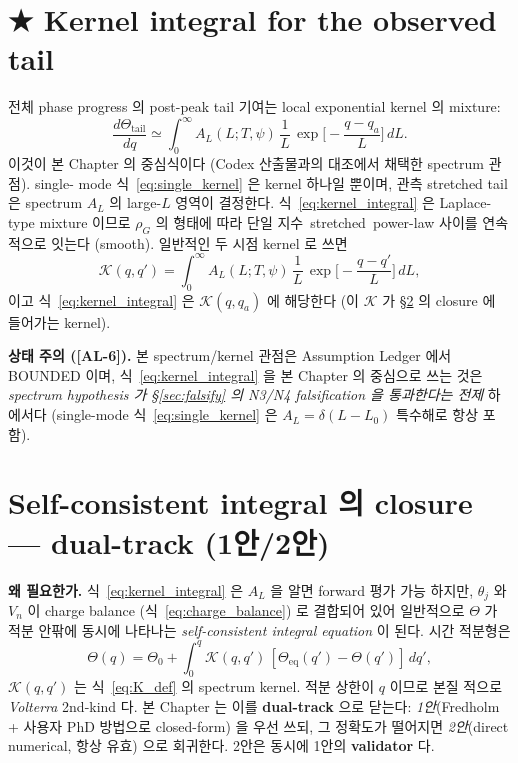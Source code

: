 \documentclass[11pt,a4paper]{article}
\newcommand{\eq}{\mathrm{eq}}
\newcommand{\AL}[1]{\textsf{[AL-#1]}}
\begin{document}
\section{★ Kernel integral for the observed tail}\label{sec:kernel}
전체 phase progress 의 post-peak tail 기여는 local exponential kernel 의 mixture:
\begin{equation}
\boxed{\;\frac{d\Theta_\mathrm{tail}}{dq}\simeq\int_0^\infty A_L(L;T,\psi)\,\frac1L\,
\exp\!\Big[-\frac{q-q_a}{L}\Big]\,dL.\;}
\label{eq:kernel_integral}
\end{equation}
이것이 본 Chapter 의 중심식이다 (Codex 산출물과의 대조에서 채택한 spectrum 관점). single-
mode 식~\eqref{eq:single_kernel} 은 kernel 하나일 뿐이며, 관측 stretched tail 은 spectrum
$A_L$ 의 large-$L$ 영역이 결정한다. 식~\eqref{eq:kernel_integral} 은 Laplace-type mixture
이므로 $\rho_G$ 의 형태에 따라 단일 지수~stretched~power-law 사이를 연속적으로 잇는다
(smooth). 일반적인 두 시점 kernel 로 쓰면
\begin{equation}
\mathcal K(q,q')=\int_0^\infty A_L(L;T,\psi)\,\frac1L\,\exp\!\Big[-\frac{q-q'}{L}\Big]\,dL,
\label{eq:K_def}
\end{equation}
이고 식~\eqref{eq:kernel_integral} 은 $\mathcal K(q,q_a)$ 에 해당한다 (이 $\mathcal K$ 가
\S\ref{sec:closure} 의 closure 에 들어가는 kernel).

\textbf{상태 주의 (\AL{6}).} 본 spectrum/kernel 관점은 Assumption Ledger 에서 BOUNDED
이며, 식~\eqref{eq:kernel_integral} 을 본 Chapter 의 중심으로 쓰는 것은 \emph{spectrum
hypothesis 가 \S\ref{sec:falsify} 의 N3/N4 falsification 을 통과한다는 전제} 하에서다
(single-mode 식~\eqref{eq:single_kernel} 은 $A_L=\delta(L-L_0)$ 특수해로 항상 포함).

\section{Self-consistent integral 의 closure — dual-track (1안/2안)}\label{sec:closure}
\textbf{왜 필요한가.} 식~\eqref{eq:kernel_integral} 은 $A_L$ 을 알면 forward 평가 가능
하지만, $\theta_j$ 와 $V_n$ 이 charge balance (식~\eqref{eq:charge_balance}) 로 결합되어
있어 일반적으로 $\Theta$ 가 적분 안팎에 동시에 나타나는 \emph{self-consistent integral
equation} 이 된다. 시간 적분형은
\begin{equation}
\Theta(q)=\Theta_0+\int_0^q \mathcal K(q,q')\,[\Theta_\eq(q')-\Theta(q')]\,dq',
\label{eq:volterra_self}
\end{equation}
$\mathcal K(q,q')$ 는 식~\eqref{eq:K_def} 의 spectrum kernel. 적분 상한이 $q$ 이므로 본질
적으로 \emph{Volterra} 2nd-kind 다. 본 Chapter 는 이를 \textbf{dual-track} 으로 닫는다:
\emph{1안}(Fredholm + 사용자 PhD 방법으로 closed-form) 을 우선 쓰되, 그 정확도가 떨어지면
\emph{2안}(direct numerical, 항상 유효) 으로 회귀한다. 2안은 동시에 1안의 \textbf{validator}
다.
\end{document}
